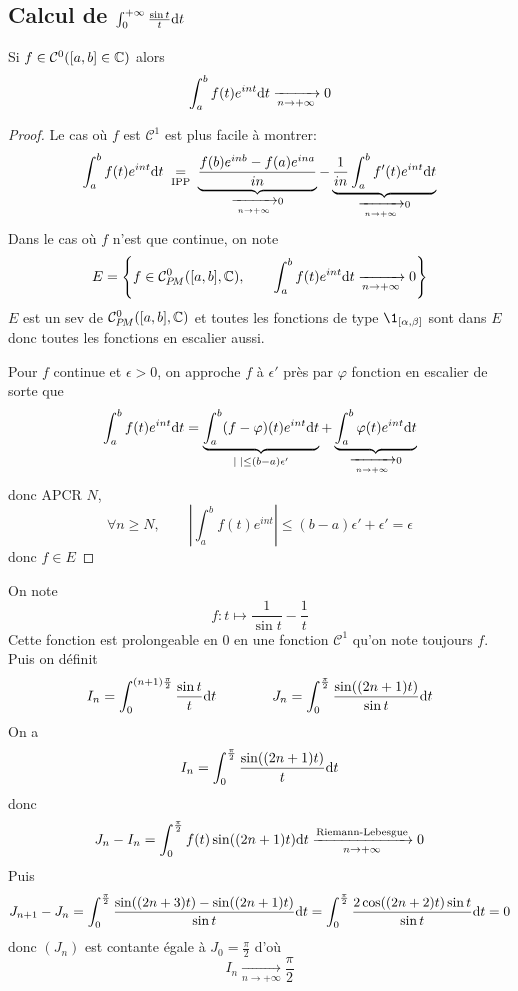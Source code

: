 \subsection{Calcul de $\int_0^{+\infty}\frac{\sin t}t\mathrm{d} t$}

\begin{res}
    Si $f\in\mathcal C^0([a, b]\in\mathbb C)$ alors \[
        \int_a^bf(t)e^{int}\mathrm{d} t\xrightarrow[n\to+\infty]{}0
    \]
\end{res}

\begin{proof}
    Le cas où $f$ est $\mathcal C^1$ est plus facile à montrer: \[
        \int_a^bf(t)e^{int}\mathrm{d} t\underset{\text{ IPP }}=\underbrace{\frac{f(b)e^{inb}-f(a)e^{ina}}{in}}_{\xrightarrow[n\to+\infty]{}0}- \underbrace{\frac1{in}\int_a^bf'(t)e^{int}\mathrm{d} t}_{\xrightarrow[n\to+\infty]{}0}
    \]
    Dans le cas où $f$ n'est que continue, on note \[
        E = \left\{ f\in \CPM([a, b], \C), \qquad \int_a^bf(t)e^{int}\diff t\xrightarrow[n\to+\infty]{}0 \right\}
    \]
    $E$ est un sev de $\CPM([a, b], \C)$ et toutes les fonctions de type $\1_{[\alpha, \beta]}$ sont dans $E$ donc toutes les fonctions en escalier aussi.

    Pour $f$ continue et $\epsilon>0$, on approche $f$ à $\epsilon'$ près par $\varphi$ fonction en escalier de sorte que \[
        \int_a^bf(t)e^{int}\mathrm{d} t=\underbrace{\int_a^b(f-\varphi)(t)e^{int}\mathrm{d} t}_{|\;|\leq (b-a)\epsilon'}+\underbrace{\int_a^b\varphi(t)e^{int}\mathrm{d} t}_{\xrightarrow[n\to+\infty]{}0}
    \]
    donc APCR $N$, \[
        \forall n\geq N, \qquad \left|\int_a^bf(t)e^{int}\right|\leq (b-a)\epsilon'+\epsilon'=\epsilon
    \]
    donc $f\in E$
\end{proof}

On note \[
    f:t\longmapsto \frac1{\sin t}-\frac1t
\]
Cette fonction est prolongeable en $0$ en une fonction $\mathcal C^1$ qu'on note toujours $f$. Puis on définit \[
    I_n=\int_0^{(n+1)\frac\pi2}\frac{\sin t}t\mathrm{d} t\qquad \qquad J_n=\int_0^{\frac\pi2}\frac{\sin((2n+1)t)}{\sin t}\mathrm{d} t
\]
On a \[
    I_n=\int_0^{\frac\pi2}\frac{\sin((2n+1)t)}{t}\mathrm{d} t
\]
donc \[
    J_n-I_n=\int_0^{\frac\pi2}f(t)\sin((2n+1)t)\mathrm{d} t\xrightarrow[n\to+\infty]{\text{Riemann-Lebesgue}}0
\]
Puis \[
    J_{n+1}-J_n=\int_0^{\frac\pi2}\frac{\sin((2n+3)t)-\sin((2n+1)t)}{\sin t}\mathrm{d} t=\int_0^{\frac\pi2}\frac{2\cos((2n+2)t)\sin t}{\sin t}\mathrm{d} t=0
\]
donc $(J_n)$ est contante égale à $J_0=\frac\pi2$ d'où \[
    I_n\xrightarrow[n\to+\infty]{}\frac\pi2
\]


